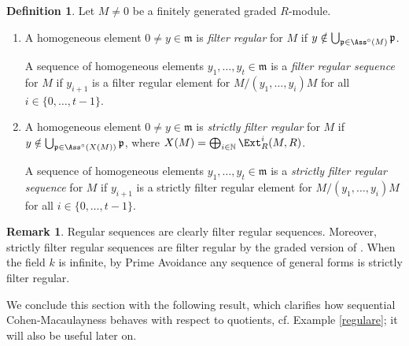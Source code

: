 \documentclass[12pt]{amsart}
\theoremstyle{definition}
\theoremstyle{definition}
\newtheorem{remark}[theorem]{Remark}
\newtheorem{definition}[theorem]{Definition}
\newcommand{\m}{\mathfrak{m}}
\def\NZQ{\mathbb}               %
\def\NN{{\NZQ N}}
\def\frk{\mathfrak}               %
\def\pp{{\frk p}}
\begin{document}
\begin{definition}\label{filterstrictlyfilter} Let $M\neq 0$ be a finitely generated graded $R$-module.
\begin{enumerate}[(1)]
\item A homogeneous element $0 \ne y \in \m$ is {\em filter regular} for $M$ if $y \notin \bigcup_{\pp \in \Ass^\circ(M)} \pp$. 

  \noindent
  A sequence of homogeneous elements $y_1,\ldots,y_t \in \m$ is a {\em filter regular sequence} for $M$ if $y_{i+1}$ is a filter regular element for $M/(y_1,\ldots,y_i)M$ for all $i \in \{0,\ldots,t-1\}$.
\item A homogeneous element $0 \ne y \in \m$ is {\em strictly filter regular} for $M$ if $y \notin\bigcup_{\pp \in \Ass^\circ(X(M))} \pp$, where $X(M) = \bigoplus_{i \in \NN} \Ext^i_R(M,R)$.

    
    \noindent A sequence of homogeneous elements $y_1,\ldots,y_t \in \m$ is a {\em strictly filter regular sequence} for $M$ if $y_{i+1}$ is a strictly filter regular element for $M/(y_1,\ldots,y_i)M$ for all $i \in \{0,\ldots,t-1\}$.
\end{enumerate}
\end{definition}

\begin{remark} \label{remark SF -> F} Regular sequences are clearly filter regular sequences. Moreover, strictly filter regular sequences are filter regular by the graded version of \cite[Corollary 11.3.3]{BSxx}. When the field $k$ is infinite, by Prime Avoidance any sequence of general forms is strictly filter regular.
\end{remark}

We conclude this section with the following result, which clarifies how sequential Cohen-Macaulayness behaves with respect to quotients, cf. Example \ref{regulare}; it will also be useful later on.
\end{document}
